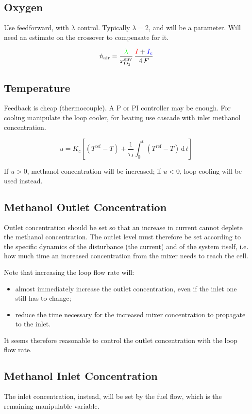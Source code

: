\documentclass[a4paper,10pt]{article}
\newcommand{\OO}{\ensuremath{\mathrm{O_2}}}
\newcommand{\Parameter}[1]{\textcolor{green}{#1}}
\newcommand{\Measurement}[1]{\textcolor{red}{#1}}
\newcommand{\Estimate}[1]{\textcolor{blue}{#1}}
\begin{document}
\subsection{Oxygen}
Use feedforward, with $\lambda$ control. Typically $\lambda=2$, and will be a
parameter. Will need an estimate on the crossover to compensate for it.

\begin{equation}
\dot n_\text{air} = \frac{\Parameter{\lambda}}{x_\OO^\text{env}} \,
\frac{\Measurement{I}+\Estimate{I_c}}{4\,F}
\end{equation}


\subsection{Temperature}
Feedback is cheap (thermocouple). A P or PI controller may be enough. For
cooling manipulate the loop cooler, for heating use cascade with inlet
methanol concentration.

\begin{equation}
u = K_c \left[ (T^\text{ref}-T) +
\frac{1}{\tau_I}\int_0^t (T^\text{ref}-T) \,\mathrm{d}\,t \right]
\end{equation}

If $u>0$, methanol concentration will be increased; if $u<0$, loop cooling will
be used instead.

\subsection{Methanol Outlet Concentration}
Outlet concentration should be set so that an increase in current cannot deplete
the methanol concentration. The outlet level must therefore be set according to
the specific dynamics of the disturbance (the current) and of the system itself,
i.e. how much time an increased concentration from the mixer needs to reach the
cell.

Note that increasing the loop flow rate will:
\begin{itemize}
\item almost immediately increase the outlet concentration, even if the inlet
one still has to change;
\item reduce the time necessary for the increased mixer concentration to
propagate to the inlet.
\end{itemize}
It seems therefore reasonable to control the outlet concentration with the loop
flow rate.

\subsection{Methanol Inlet Concentration}
The inlet concentration, instead, will be set by the fuel flow, which is the
remaining manipulable variable.
\end{document}
